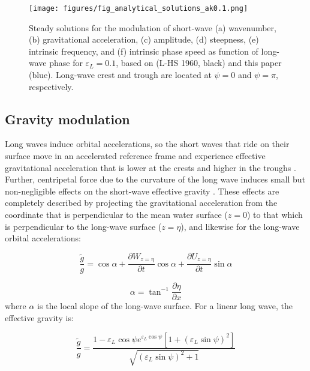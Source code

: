 \documentclass[lineno]{jfm}
\begin{document}
\begin{figure}
\centering
\texttt{[image: figures/fig\_analytical\_solutions\_ak0.1.png]}
\caption{
  Steady solutions for the modulation of short-wave (a) wavenumber, (b)
  gravitational acceleration, (c) amplitude, (d) steepness, (e) intrinsic
  frequency, and (f) intrinsic phase speed as function of long-wave phase for
  $\varepsilon_L = 0.1$, based on
  \citet{longuet1960changes} (L-HS 1960, black) and this paper (blue).
  Long-wave crest and trough are located at $\psi = 0$ and $\psi = \pi$,
  respectively.
}
\label{fig:analytical_solutions_ak0.1}
\end{figure}

\subsection{Gravity modulation}
\label{subsection:gravity_modulation}

Long waves induce orbital accelerations, so the short waves that ride on their
surface move in an accelerated reference frame and experience effective
gravitational acceleration that is lower at the crests and higher in the troughs
\citep{longuet1986eulerian,longuet1987propagation}.
Further, centripetal force due to the curvature of the long wave induces small
but non-negligible effects on the short-wave effective gravity
\citep{phillips1981dispersion,zhang1990evolution}.
These effects are completely described by projecting the gravitational
acceleration from the coordinate that is perpendicular to the mean water surface
($z=0$) to that which is perpendicular to the long-wave surface ($z=\eta$),
and likewise for the long-wave orbital accelerations:

\begin{equation}
\label{eq:gravity_modulation_general}
\frac{\widetilde{g}}{g}
  = \cos{\alpha} 
  + \dfrac{\partial W_{z=\eta}}{\partial t} \cos{\alpha}
  + \dfrac{\partial U_{z=\eta}}{\partial t} \sin{\alpha}
\end{equation}

\begin{equation}
\label{eq:local_slope}
\alpha = \tan^{-1}{\dfrac{\partial \eta}{\partial x}}
\end{equation}
where $\alpha$ is the local slope of the long-wave surface.
For a linear long wave, the effective gravity is:

\begin{equation}
\label{eq:gravity_modulation_linear}
\frac{\widetilde{g}}{g}
  = 
  \frac{
    1 - \varepsilon_L \cos{\psi} e^{\varepsilon_L \cos{\psi}}
    \left[ 1 + \left(\varepsilon_L \sin{\psi}\right)^2 \right]
  }
  {\sqrt{\left(\varepsilon_L \sin{\psi}\right)^2 + 1}}
\end{equation}
\end{document}
